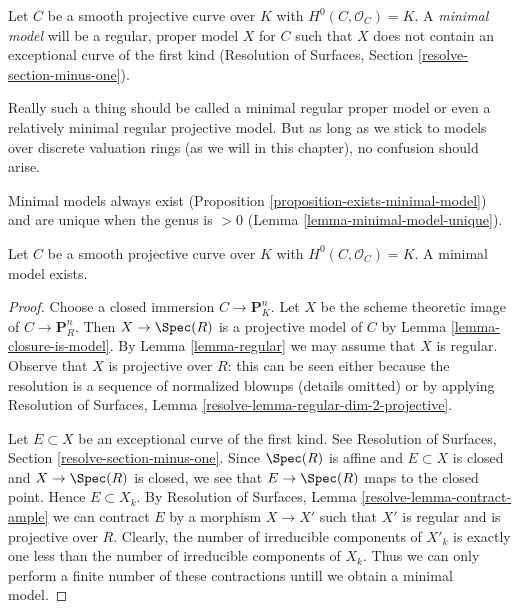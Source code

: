 \begin{definition}
\label{definition-minimal-model}
Let $C$ be a smooth projective curve over $K$ with
$H^0(C, \mathcal{O}_C) = K$. A {\it minimal model}
will be a regular, proper model $X$ for $C$ such that
$X$ does not contain an exceptional curve of the first kind
(Resolution of Surfaces, Section \ref{resolve-section-minus-one}).
\end{definition}

\noindent
Really such a thing should be called a minimal regular proper model
or even a relatively minimal regular projective model. But as long
as we stick to models over discrete valuation rings (as we will
in this chapter), no confusion should arise.

\medskip\noindent
Minimal models always exist
(Proposition \ref{proposition-exists-minimal-model}) and are unique
when the genus is $> 0$ (Lemma \ref{lemma-minimal-model-unique}).

\begin{proposition}
\label{proposition-exists-minimal-model}
Let $C$ be a smooth projective curve over $K$ with
$H^0(C, \mathcal{O}_C) = K$. A minimal model exists.
\end{proposition}

\begin{proof}
Choose a closed immersion $C \to \mathbf{P}^n_K$. Let
$X$ be the scheme theoretic image of $C \to \mathbf{P}^n_R$.
Then $X \to \Spec(R)$ is a projective model of $C$ by
Lemma \ref{lemma-closure-is-model}.
By Lemma \ref{lemma-regular} we may assume that $X$
is regular. Observe that $X$ is projective over $R$:
this can be seen either because the resolution is a sequence
of normalized blowups (details omitted) or by applying
Resolution of Surfaces, Lemma \ref{resolve-lemma-regular-dim-2-projective}.

\medskip\noindent
Let $E \subset X$ be an exceptional curve of the first kind.
See Resolution of Surfaces, Section \ref{resolve-section-minus-one}.
Since $\Spec(R)$ is affine and $E \subset X$ is closed and
$X \to \Spec(R)$ is closed, we see that $E \to \Spec(R)$
maps to the closed point. Hence $E \subset X_k$. By
Resolution of Surfaces, Lemma \ref{resolve-lemma-contract-ample}
we can contract $E$ by a morphism $X \to X'$ such that $X'$ is
regular and is projective over $R$. Clearly, the number of
irreducible components of $X'_k$ is exactly one less than the
number of irreducible components of $X_k$. Thus we can only
perform a finite number of these contractions untill we
obtain a minimal model.
\end{proof}





